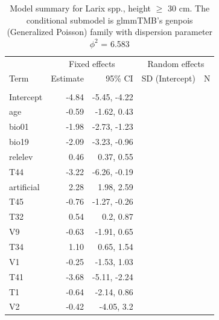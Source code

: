 \documentclass[
]{article}
\begin{document}
\begin{longtable}[t]{lrrrr}
\caption{\label{tab:summaries-tables}\label{tab:LNA}Model summary for Larix spp., height $\geq$ 30 cm. The conditional submodel is glmmTMB's genpois (Generalized Poisson) family with dispersion parameter $\phi^{2}$ = 6.583}\\
\toprule
\multicolumn{1}{c}{ } & \multicolumn{2}{c}{Fixed effects} & \multicolumn{2}{c}{Random effects} \\
\cmidrule(l{3pt}r{3pt}){2-3} \cmidrule(l{3pt}r{3pt}){4-5}
Term & Estimate & 95\% CI & SD (Intercept) & N\\
\midrule
\addlinespace[0.3em]
\multicolumn{5}{l}{\textbf{Conditional model}}\\
\hspace{1em}Intercept & -4.84 & -5.45, -4.22 &  & \\
\hspace{1em}age & -0.59 & -1.62, 0.43 &  & \\
\hspace{1em}bio01 & -1.98 & -2.73, -1.23 &  & \\
\hspace{1em}bio19 & -2.09 & -3.23, -0.96 &  & \\
\hspace{1em}relelev & 0.46 & 0.37, 0.55 &  & \\
\hspace{1em}T44 & -3.22 & -6.26, -0.19 &  & \\
\hspace{1em}artificial & 2.28 & 1.98, 2.59 &  & \\
\hspace{1em}T45 & -0.76 & -1.27, -0.26 &  & \\
\hspace{1em}T32 & 0.54 & 0.2, 0.87 &  & \\
\hspace{1em}V9 & -0.63 & -1.91, 0.65 &  & \\
\hspace{1em}T34 & 1.10 & 0.65, 1.54 &  & \\
\hspace{1em}V1 & -0.25 & -1.53, 1.03 &  & \\
\hspace{1em}T41 & -3.68 & -5.11, -2.24 &  & \\
\hspace{1em}T1 & -0.64 & -2.14, 0.86 &  & \\
\hspace{1em}V2 & -0.42 & -4.05, 3.2 &  & \\

\end{longtable}
\end{document}
